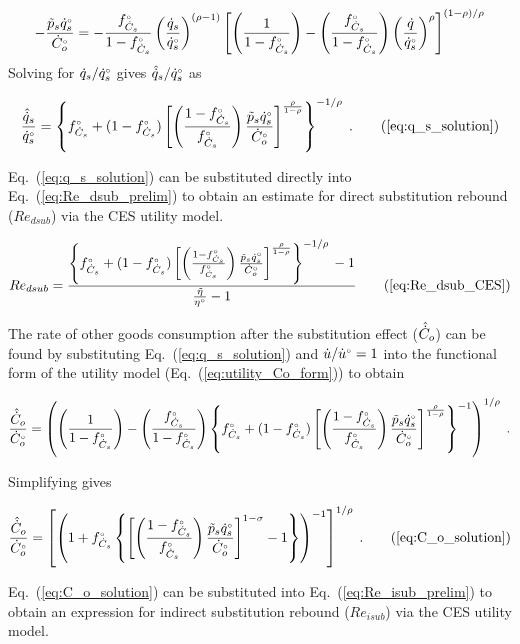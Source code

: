 \begin{equation}
  -\frac{\amacro{p}_s \rbempl{q}_s}
        {\rbempl{C}_o} = 
    -\frac{\fCs}{1 - \fCs} \left( \frac{\rate{q}_s}{\rbempl{q}_s} \right)^{(\rho -1)} %
        \left[ \left( \frac{1}{1 - \fCs} \right) 
                - \left( \frac{\fCs}{1 - \fCs} \right) 
                          \left( \frac{\rate{q}}{\rbempl{q}_s} \right)^\rho \right]^{(1 - \rho)/\rho}
\end{equation}
%
Solving for $\dot{q}_s/{}{\dot{q}}^{\scriptscriptstyle \circ}_s$ gives $\hat{\dot{q}}_s/{}{\dot{q}}^{\scriptscriptstyle \circ}_s$ as

\begin{equation}
  \frac{\rasub{q}_s}{\rbempl{q}_s} = \qssolution{} \; . \tag{\ref{eq:q_s_solution}}
\end{equation}

Eq.~(\ref{eq:q_s_solution}) can be substituted directly
into Eq.~(\ref{eq:Re_dsub_prelim})
to obtain an estimate for direct substitution rebound ($Re_{dsub}$)
via the CES utility model.

\begin{equation}
  Re_{dsub} = \RedsubCES{} \tag{\ref{eq:Re_dsub_CES}}
\end{equation}

The rate of other goods consumption after the substitution effect ($\hat{\dot{C}}_o$) 
can be found by substituting Eq.~(\ref{eq:q_s_solution}) and 
$\dot{u}/{}{\dot{u}}^{\scriptscriptstyle \circ} = 1$ 
into the functional form of the utility model (Eq.~(\ref{eq:utility_Co_form}))
to obtain

\begin{equation}
  \frac{\hat{\dot{C}}_o}{{}{\dot{C}}^{\scriptscriptstyle \circ}_o} = \left( \left( \frac{1}{1-{}{f}^{\scriptscriptstyle \circ}_{\dot{C}_s}} \right) 
                                     - \left( \frac{{}{f}^{\scriptscriptstyle \circ}_{\dot{C}_s}}{1-{}{f}^{\scriptscriptstyle \circ}_{\dot{C}_s}} \right)   
              \left\{ {}{f}^{\scriptscriptstyle \circ}_{\dot{C}_s} + (1-{}{f}^{\scriptscriptstyle \circ}_{\dot{C}_s})
                  \left[ \left( \frac{1-{}{f}^{\scriptscriptstyle \circ}_{\dot{C}_s}}{{}{f}^{\scriptscriptstyle \circ}_{\dot{C}_s}} \right) \frac{\tilde{p}_s {}{\dot{q}}^{\scriptscriptstyle \circ}_s}{{}{\dot{C}}^{\scriptscriptstyle \circ}_o}   \right] 
                      ^{\frac{\rho}{1-\rho}} \right\} ^{-1} \right) ^{1/\rho} \; .
\end{equation}

Simplifying gives

\begin{equation}
  \frac{\rasub{C}_o}{\rbempl{C}_o} = \Cosolution{} \; . \tag{\ref{eq:C_o_solution}}
\end{equation}

Eq.~(\ref{eq:C_o_solution}) can be substituted into Eq.~(\ref{eq:Re_isub_prelim})
to obtain an expression for indirect substitution rebound ($Re_{isub}$)
via the CES utility model.

